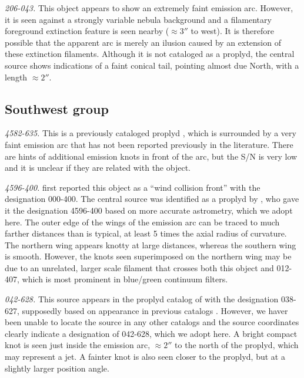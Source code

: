 \documentclass[iop, apj]{emulateapj}
\begin{document}
\textit{206-043.} This object appears to show an extremely faint
emission arc.  However, it is seen against a strongly variable nebula
background and a filamentary foreground extinction feature is seen
nearby (\(\approx 3''\) to west).  It is therefore possible that
the apparent arc is merely an ilusion caused by an extension of these
extinction filaments.  Although it is not cataloged as a proplyd, the
central source shows indications of a faint conical tail, pointing
almost due North, with a length \(\approx 2''\). 

\subsection{Southwest group}
\label{sec:sw-group}

\textit{4582-635.} This is a previously cataloged proplyd
\citep{Ricci:2008a}, which is surrounded by a very faint emission arc
that has not been reported previously in the literature. There are
hints of additional emission knots in front of the arc, but the S/N is
very low and it is unclear if they are related with the object.

\textit{4596-400.} \citet{Bally:2000a} first reported this object as a
``wind collision front'' with the designation 000-400. The central
source was identified as a proplyd by \citet{Ricci:2008a}, who gave it
the designation 4596-400 based on more accurate astrometry, which we
adopt here. The outer edge of the wings of the emission arc can be
traced to much farther distances than is typical, at least 5 times the
axial radius of curvature. The northern wing appears knotty at large
distances, whereas the southern wing is smooth. However, the knots
seen superimposed on the northern wing may be due to an unrelated,
larger scale filament that crosses both this object and 012-407, which
is most prominent in blue/green continuum filters.

\textit{042-628.} This source appears in the proplyd catalog of
\citet{Ricci:2008a} with the designation 038-627, supposedly based on
appearance in previous catalogs \citep{ODell:1996a}. However, we haver
been unable to locate the source in any other catalogs and the source
coordinates clearly indicate a designation of 042-628, which we adopt
here.  A bright compact knot is seen just inside the emission arc,
\(\approx 2''\) to the north of the proplyd, which may represent a
jet.  A fainter knot is also seen closer to the proplyd, but at a
slightly larger position angle.
\end{document}
